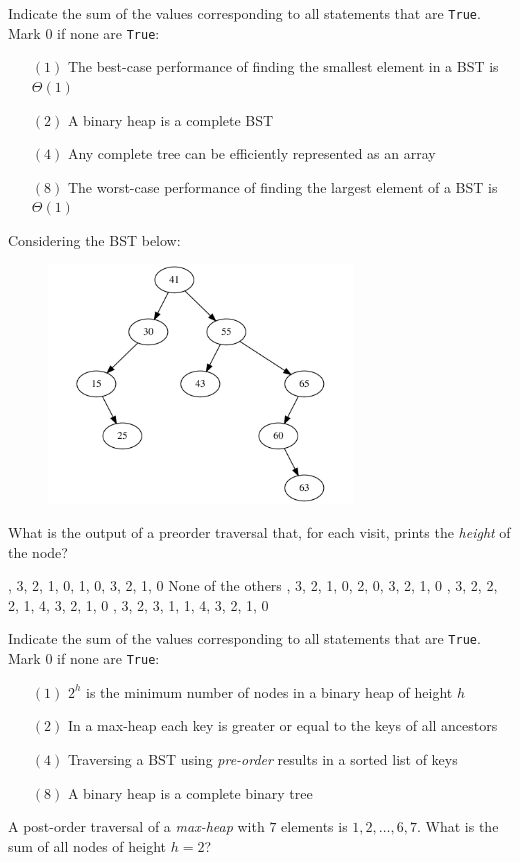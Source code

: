 \documentclass[12pt,addpoints]{exam}
\begin{document}
\begin{questions}

\question[5] 
Indicate the sum of the values corresponding to all statements that are \verb|True|.  Mark $0$ if none are \verb|True|:
\begin{itemize}
	\item[$(1)$] The best-case performance of finding the smallest element in a BST is $\Theta(1)$
	\item[$(2)$] A binary heap is a complete BST
	\item[$(4)$] Any complete tree can be efficiently represented as an array
	\item[$(8)$] The worst-case performance of finding the largest element of a BST is $\Theta(1)$\end{itemize}
\answerline

\question[5] Considering the BST below:
\begin{figure}[h!]
  \centering
  \includegraphics[height=2.5in]{imgs/bst.pdf}
\end{figure}

What is the output of a preorder traversal that, for each visit, prints the {\it height} of the node?
\begin{choices}	
	, 3, 2, 1, 0, 1, 0, 3, 2, 1, 0	
	\choice None of the others	
	, 3, 2, 1, 0, 2, 0, 3, 2, 1, 0	
	, 3, 2, 2, 2, 1, 4, 3, 2, 1, 0	
	, 3, 2, 3, 1, 1, 4, 3, 2, 1, 0
\end{choices}
\answerline

\question[5] 
Indicate the sum of the values corresponding to all statements that are \verb|True|.  Mark $0$ if none are \verb|True|:
\begin{itemize}
	\item[$(1)$] $2^h$ is the minimum number of nodes in a binary heap of height $h$
	\item[$(2)$] In a max-heap each key is greater or equal to the keys of all ancestors
	\item[$(4)$] Traversing a BST using {\it pre-order} results in a sorted list of keys
	\item[$(8)$] A binary heap is a complete binary tree\end{itemize}
\answerline

\question[5] 
A post-order traversal of a {\it max-heap} with $7$ elements is $1,2,\dots,6,7$.  What is the sum of all nodes of height $h=2$?
\answerline

\end{questions}
\end{document}
